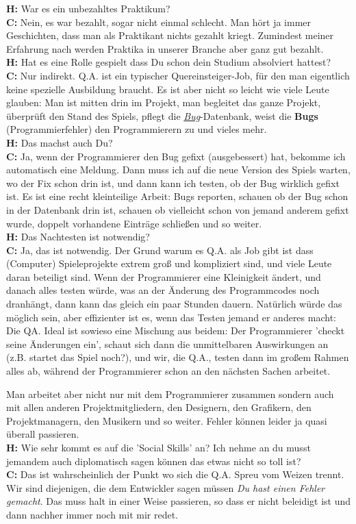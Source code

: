 \textbf{H:} War es ein unbezahltes Praktikum? \\
\textbf{C:} Nein, es war bezahlt, sogar nicht einmal schlecht. Man hört ja immer Geschichten, dass man als Praktikant nichts gezahlt kriegt. Zumindest meiner Erfahrung nach werden Praktika in unserer Branche aber ganz gut bezahlt. \\
\textbf{H:} Hat es eine Rolle gespielt dass Du schon dein Studium absolviert hattest? \\
\textbf{C:} Nur indirekt. Q.A. ist ein typischer Quereinsteiger-Job, für den man eigentlich keine spezielle Ausbildung braucht. Es ist aber nicht so leicht wie viele Leute glauben: Man ist mitten drin im Projekt, man begleitet das ganze Projekt, überprüft den Stand des Spiels, pflegt die \href{https://de.wikipedia.org/wiki/Programmfehler}{\textit{Bug}}-Datenbank, weist die \textbf{Bugs} (Programmierfehler) den Programmierern zu und vieles mehr.  \\
\textbf{H:} Das machst auch Du? \\
\textbf{C:} Ja, wenn der Programmierer den Bug gefixt (ausgebessert) hat, bekomme ich automatisch eine Meldung. Dann muss ich auf die neue Version des Spiels warten, wo der Fix schon drin ist, und dann kann ich testen, ob der Bug wirklich gefixt ist. Es ist eine recht kleinteilige Arbeit: Bugs reporten, schauen ob der Bug schon in der Datenbank drin ist, schauen ob vielleicht schon von jemand anderem gefixt wurde, doppelt vorhandene Einträge schließen und so weiter. \\
\textbf{H:} Das Nachtesten ist notwendig? \\
\textbf{C:} Ja, das ist notwendig. Der Grund warum es Q.A. als Job gibt ist dass (Computer) Spieleprojekte extrem groß und kompliziert sind, und viele Leute daran beteiligt sind. Wenn der Programmierer eine Kleinigkeit ändert, und danach alles testen würde, was  an der Änderung des Programmcodes noch dranhängt, dann kann das  gleich ein paar Stunden dauern. Natürlich würde das möglich sein, aber effizienter ist es, wenn das Testen jemand er anderes macht: Die QA. Ideal ist sowieso eine Mischung aus beidem: Der Programmierer 'checkt seine Änderungen ein', schaut sich dann die unmittelbaren Auswirkungen an (z.B. startet das Spiel noch?), und wir, die Q.A., testen dann im großem Rahmen alles ab, während der Programmierer schon an den nächsten Sachen arbeitet.

Man arbeitet aber nicht nur mit dem Programmierer zusammen sondern auch mit allen anderen Projektmitgliedern, den Designern, den Grafikern, den Projektmanagern, den Musikern und so weiter. Fehler können leider ja quasi überall passieren. \\
\textbf{H:} Wie sehr kommt es auf die 'Social Skills' an? Ich nehme an du musst jemandem auch diplomatisch sagen können das etwas nicht so toll ist? \\
\textbf{C:} Das ist wahrscheinlich der Punkt wo sich die Q.A. Spreu vom Weizen trennt. Wir sind diejenigen, die dem Entwickler sagen müssen \emph{Du hast einen Fehler gemacht}. Das muss halt in einer Weise passieren, so dass er nicht beleidigt ist und dann nachher immer noch mit mir redet.

